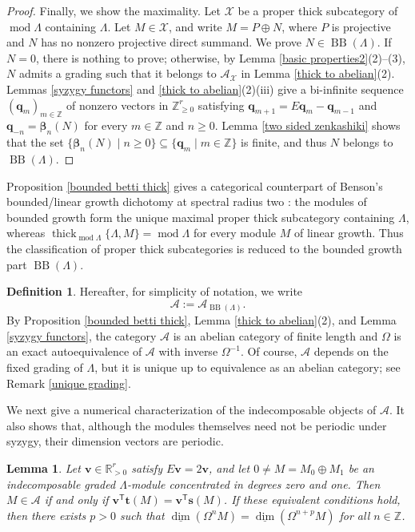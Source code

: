 \documentclass{amsart}
\newtheorem{lem}[thm]{Lemma}
\theoremstyle{definition}
\newtheorem{dfn}[thm]{Definition}
\theoremstyle{remark}
\numberwithin{equation}{thm}
\def\A{\mathcal{A}}
\def\BB{\operatorname{BB}}
\def\dimvec{\underline{\dim}}
\def\dim{\operatorname{dim}}
\def\L{\Lambda}
\def\ge{\geqslant}
\def\mod{\operatorname{mod}}
\def\T{\mathsf{T}}
\def\thick{\operatorname{thick}}
\def\X{\mathcal{X}}
\def\Z{\mathbb{Z}}
\def\bfs{\mathbf{s}}
\def\bft{\mathbf{t}}
\def\bfq{\mathbf{q}}
\def\bfv{\mathbf{v}}
\begin{document}
\begin{proof}
Finally, we show the maximality.
Let $\X$ be a proper thick subcategory of $\mod\L$ containing $\L$.
Let $M\in\X$, and write $M=P\oplus N$, where $P$ is projective and $N$ has no nonzero projective direct summand. We prove $N\in\BB(\L)$. If $N=0$, there is nothing to prove; otherwise, by Lemma \ref{basic properties2}(2)--(3), $N$ admits a grading such that it belongs to $\A_\X$ in Lemma \ref{thick to abelian}(2).
Lemmas \ref{syzygy functors} and \ref{thick to abelian}(2)(iii) give a bi-infinite sequence $(\bfq_m)_{m\in\Z}$ of nonzero vectors in $\Z_{\ge0}^r$ satisfying $\bfq_{m+1}=E\bfq_m-\bfq_{m-1}$ and $\bfq_{-n}=\boldsymbol{\beta}_n(N)$ for every $m\in\Z$ and $n\ge0$.
Lemma \ref{two sided zenkashiki} shows that the set $\{\boldsymbol{\beta}_n(N)\mid n\ge 0\}\subseteq\{\bfq_m\mid m\in\Z\}$ is finite, and thus $N$ belongs to $\BB(\L)$.  
\end{proof}

Proposition \ref{bounded betti thick} gives a categorical counterpart of Benson's bounded/linear growth dichotomy at spectral radius two \cite{Ben}: the modules of bounded growth form the unique maximal proper thick subcategory containing $\L$, whereas $\thick_{\mod\L}\{\L,M\}=\mod\L$ for every module $M$ of linear growth.
Thus the classification of proper thick subcategories is reduced to the bounded growth part $\BB(\L)$.

\begin{dfn}
Hereafter, for simplicity of notation, we write 
$$
\A:=\A_{\BB(\L)}.
$$
By Proposition \ref{bounded betti thick}, Lemma \ref{thick to abelian}(2), and Lemma \ref{syzygy functors}, the category $\A$ is an abelian category of finite length and $\Omega$ is an exact autoequivalence of $\A$ with inverse $\Omega^{-1}$. Of course, $\A$ depends on the fixed grading of $\L$, but it is unique up to equivalence as an abelian category; see Remark \ref{unique grading}.
\end{dfn}

We next give a numerical characterization of the indecomposable objects of $\A$. It also shows that, although the modules themselves need not be periodic under syzygy, their dimension vectors are periodic.

\begin{lem}\label{periodic}
Let $\bfv\in\mathbb R_{>0}^r$ satisfy $E\bfv=2\bfv$, and let $0\ne M=M_0\oplus M_1$ be an indecomposable graded $\L$-module concentrated in degrees zero and one.
Then $M\in\A$ if and only if $\bfv^{\T}\bft(M)=\bfv^{\T}\bfs(M)$.
If these equivalent conditions hold, then there exists $p>0$ such that $\dimvec(\Omega^n M)=\dimvec(\Omega^{n+p} M)$ for all $n\in\Z$.
\end{lem}
\end{document}
